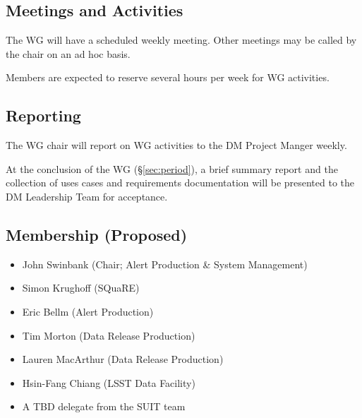 \documentclass[DM,lsstdraft,toc]{lsstdoc}
\begin{document}
\subsection{Meetings and Activities}

The WG will have a scheduled weekly meeting. Other meetings may be called by
the chair on an ad hoc basis.

Members are expected to reserve several hours per week for WG activities.

\subsection{Reporting}

The WG chair will report on WG activities to the DM Project Manger weekly.

At the conclusion of the WG (\S\ref{sec:period}), a brief summary report and
the collection of uses cases and requirements documentation will be presented
to the DM Leadership Team for acceptance.

\subsection{Membership (Proposed)}
\label{sec:members}

\begin{itemize}

  \item{John Swinbank (Chair; Alert Production \& System Management)}
  \item{Simon Krughoff (SQuaRE)}
  \item{Eric Bellm (Alert Production)}
  \item{Tim Morton (Data Release Production)}
  \item{Lauren MacArthur (Data Release Production)}
  \item{Hsin-Fang Chiang (LSST Data Facility)}
  \item{A TBD delegate from the SUIT team}

\end{itemize}


\end{document}
